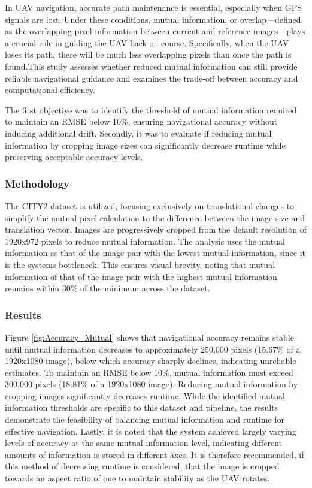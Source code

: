 In UAV navigation, accurate path maintenance is essential, especially when GPS signals are lost. Under these conditions, mutual information, or overlap—defined as the overlapping pixel information between current and reference images—plays a crucial role in guiding the UAV back on course. Specifically, when the UAV loses its path, there will be much less overlapping pixels than once the path is found.This study assesses whether reduced mutual information can still provide reliable navigational guidance and examines the trade-off between accuracy and computational efficiency.

The first objective was to identify the threshold of mutual information required to maintain an RMSE below 10\%, ensuring navigational accuracy without inducing additional drift. Secondly, it was to evaluate if reducing mutual information by cropping image sizes can significantly decrease runtime while preserving acceptable accuracy levels.

\subsubsection{Methodology}

The CITY2 dataset is utilized, focusing exclusively on translational changes to simplify the mutual pixel calculation to the difference between the image size and translation vector. Images are progressively cropped from the default resolution of 1920x972 pixels to reduce mutual information. The analysis uses the mutual information as that of the image pair with the lowest mutual information, since it is the systems bottleneck. This ensures visual brevity, noting that mutual information of that of the image pair with the highest mutual information remains within 30\% of the minimum across the dataset.

\subsubsection{Results}

Figure \ref{fig:Accuracy_Mutual} shows that navigational accuracy remains stable until mutual information decreases to approximately 250,000 pixels (15.67\% of a 1920x1080 image), below which accuracy sharply declines, indicating unreliable estimates. To maintain an RMSE below 10\%, mutual information must exceed 300,000 pixels (18.81\% of a 1920x1080 image). Reducing mutual information by cropping images significantly decreases runtime. While the identified mutual information thresholds are specific to this dataset and pipeline, the results demonstrate the feasibility of balancing mutual information and runtime for effective navigation. Lastly, it is noted that the system achieved largely varying levels of accuracy at the same mutual information level, indicating different amounts of information is stored in different axes. It is therefore recommended, if this method of decreasing runtime is considered, that the image is cropped towards an aspect ratio of one to maintain stability as the UAV rotates.


